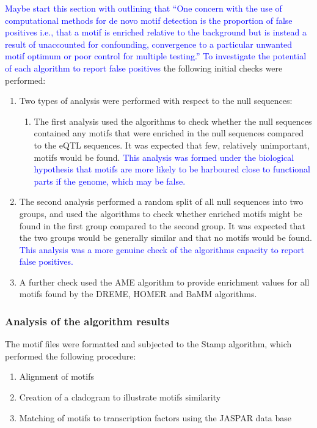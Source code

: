 \documentclass[12pt]{article}
\begin{document}
\textcolor{blue}{Maybe start this section with outlining that ``One concern with the use of computational methods for de novo motif detection is the proportion of false positives i.e., that a motif is enriched relative to the background but is instead a result of unaccounted for confounding, convergence to a particular unwanted motif optimum or poor control for multiple testing.'' To investigate the potential of each algorithm to report false positives} the following initial checks were performed:
\begin{enumerate}
\item Two types of analysis were performed with respect to the null sequences:
\begin{enumerate}
\item The first analysis used the algorithms to check whether the null sequences contained any motifs that were enriched in the null sequences compared to the eQTL sequences. It was expected that few, relatively unimportant, motifs would be found. \textcolor{blue}{ This analysis was formed under the biological hypothesis that motifs are more likely to be harboured close to functional parts if the genome, which may be false.}
\end{enumerate}
\item The second analysis performed a random split of all null sequences into two groups, and used the algorithms to check whether enriched motifs might be found in the first group compared to the second group. It was expected that the two groups would be generally similar and that no motifs would be found. \textcolor{blue}{ This analysis was a more genuine check of the algorithms capacity to report false positives.} 
\item A further check used the AME algorithm \citep{Buske2010} to provide enrichment values for all motifs found by the DREME, HOMER and BaMM algorithms. 
\end{enumerate}

\subsubsection{Analysis of the algorithm results}

The motif files were formatted and subjected to the Stamp algorithm, which performed the following procedure:
\begin{enumerate}
\item Alignment of motifs
\item Creation of a cladogram to illustrate motifs similarity
\item Matching of motifs to transcription factors using the JASPAR data base \citep{Mathelier2016}
\end{enumerate}
\end{document}
